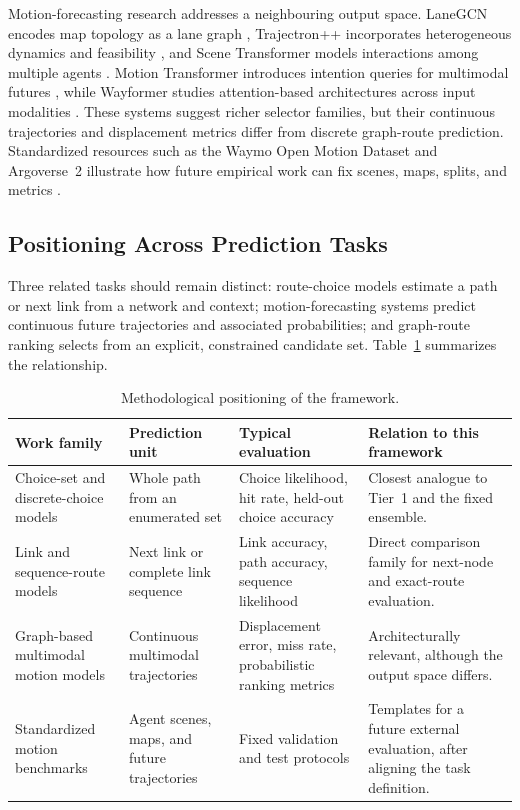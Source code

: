 \documentclass[11pt,letterpaper]{article}
\begin{document}
Motion-forecasting research addresses a neighbouring output space. LaneGCN encodes map topology as a lane graph \cite{liang2020}, Trajectron++ incorporates heterogeneous dynamics and feasibility \cite{salzmann2020}, and Scene Transformer models interactions among multiple agents \cite{ngiam2022}. Motion Transformer introduces intention queries for multimodal futures \cite{shi2022}, while Wayformer studies attention-based architectures across input modalities \cite{nayakanti2023}. These systems suggest richer selector families, but their continuous trajectories and displacement metrics differ from discrete graph-route prediction. Standardized resources such as the Waymo Open Motion Dataset and Argoverse~2 illustrate how future empirical work can fix scenes, maps, splits, and metrics \cite{ettinger2021,wilson2021}.

\subsection{Positioning Across Prediction Tasks}

Three related tasks should remain distinct: route-choice models estimate a path or next link from a network and context; motion-forecasting systems predict continuous future trajectories and associated probabilities; and graph-route ranking selects from an explicit, constrained candidate set. Table~\ref{tab:positioning} summarizes the relationship.

\begin{table}[htbp]
\centering
\caption{Methodological positioning of the framework.}
\label{tab:positioning}
\footnotesize
\begin{tabularx}{\textwidth}{>{\raggedright\arraybackslash}p{} >{\raggedright\arraybackslash}p{} >{\raggedright\arraybackslash}p{} X}
\toprule
\textbf{Work family} & \textbf{Prediction unit} & \textbf{Typical evaluation} & \textbf{Relation to this framework} \\
\midrule
Choice-set and discrete-choice models \cite{yao2020,wang2024} & Whole path from an enumerated set & Choice likelihood, hit rate, held-out choice accuracy & Closest analogue to Tier~1 and the fixed ensemble. \\
Link and sequence-route models \cite{zhao2023,qiu2024} & Next link or complete link sequence & Link accuracy, path accuracy, sequence likelihood & Direct comparison family for next-node and exact-route evaluation. \\
Graph-based multimodal motion models \cite{liang2020,salzmann2020,shi2022,nayakanti2023,ngiam2022} & Continuous multimodal trajectories & Displacement error, miss rate, probabilistic ranking metrics & Architecturally relevant, although the output space differs. \\
Standardized motion benchmarks \cite{ettinger2021,wilson2021} & Agent scenes, maps, and future trajectories & Fixed validation and test protocols & Templates for a future external evaluation, after aligning the task definition. \\
\bottomrule
\end{tabularx}
\end{table}
\end{document}
